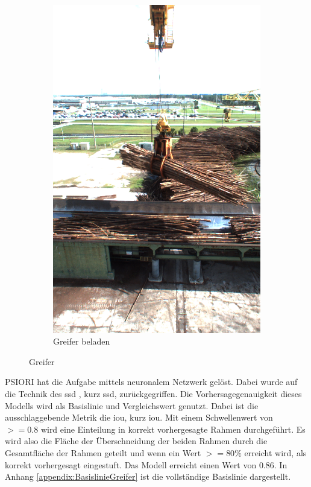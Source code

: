 \begin{figure}[h]
\begin{subfigure}[c]{0.49\textwidth}
		\end{subfigure}
		\begin{subfigure}[c]{0.49\textwidth}			
			\includegraphics[width=1\textwidth, center]{bilder/Grundlagen/Logs_14.png}
			\caption[Bsp. Bild: Greifer mit Baumstämmen]{Greifer beladen}
			\label{img:Logs}	
		\end{subfigure}
		\caption{Greifer}
		\label{img:Greifer}
	\end{figure}	
	PSIORI hat die Aufgabe mittels neuronalem Netzwerk gelöst. Dabei wurde auf die Technik des \acl{ssd} \cite{Liu.2015}, kurz \ac{ssd},  zurückgegriffen. Die Vorhersagegenauigkeit dieses Modells wird als Basislinie und Vergleichswert genutzt. Dabei ist die ausschlaggebende Metrik die \acl{iou}, kurz \ac{iou}. Mit einem Schwellenwert von $>= 0.8$ wird eine Einteilung in korrekt vorhergesagte Rahmen durchgeführt. Es wird also die Fläche der Überschneidung der beiden Rahmen durch die Gesamtfläche der Rahmen geteilt und wenn ein Wert $>= 80\%$ erreicht wird, als korrekt vorhergesagt eingestuft. Das Modell erreicht einen Wert von $0.86$. In Anhang \ref{appendix:BasislinieGreifer} ist die vollständige Basislinie dargestellt.
	

